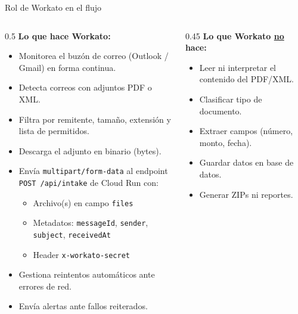 \documentclass[aspectratio=169]{beamer}
\begin{document}
\begin{frame}{Rol de Workato en el flujo}
\begin{columns}[T]
\begin{column}{0.5\textwidth}
  \textbf{Lo que hace Workato:}
  \vspace{0.2cm}
  \begin{itemize}
    \item[\faEnvelope] Monitorea el buzón de correo (Outlook / Gmail) en forma continua.
    \item[\faPaperclip] Detecta correos con adjuntos PDF o XML.
    \item[\faFilter] Filtra por remitente, tamaño, extensión y lista de permitidos.
    \item[\faDownload] Descarga el adjunto en binario (bytes).
    \item[\faPaperPlane] Envía \texttt{multipart/form-data} al endpoint\\
      \texttt{POST /api/intake} de Cloud Run con:
      \begin{itemize}
        \item[\scriptsize\faFile] Archivo(s) en campo \texttt{files}
        \item[\scriptsize\faTag] Metadatos: \texttt{messageId}, \texttt{sender}, \texttt{subject}, \texttt{receivedAt}
        \item[\scriptsize\faKey] Header \texttt{x-workato-secret}
      \end{itemize}
    \item[\faSync] Gestiona reintentos automáticos ante errores de red.
    \item[\faBell] Envía alertas ante fallos reiterados.
  \end{itemize}
\end{column}
\begin{column}{0.45\textwidth}
  \textbf{Lo que Workato \underline{no} hace:}
  \vspace{0.2cm}
  \begin{itemize}
    \item[\faTimes] Leer ni interpretar el contenido del PDF/XML.
    \item[\faTimes] Clasificar tipo de documento.
    \item[\faTimes] Extraer campos (número, monto, fecha).
    \item[\faTimes] Guardar datos en base de datos.
    \item[\faTimes] Generar ZIPs ni reportes.
  \end{itemize}


\end{column}
\end{columns}
\end{frame}
\end{document}
